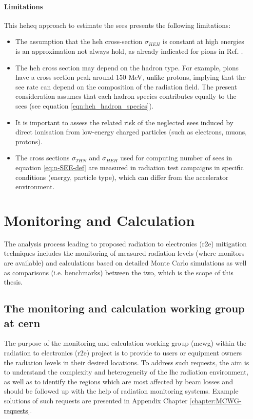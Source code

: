 \documentclass[encoding=utf8,british]{tumphthesis}
\begin{document}
\subsubsection{Limitations}

This \acrshort{heheq} approach to estimate the \acrshort{see}s presents the following limitations:
\begin{itemize}
    \item The assumption that the \acrshort{heh} cross-section $\sigma_{HEH}$ is constant at high energies is an approximation not always hold, as already indicated for pions in Ref. \cite{Coronetti:2725324}. 
    \item The \acrshort{heh} cross section may depend on the hadron type. For example, pions have a cross section peak around 150 MeV, unlike protons, implying that the \acrshort{see} rate can depend on the composition of the radiation field. The present consideration assumes that each hadron species contributes equally to the \acrshort{see}s (see equation \ref{eqn:heh_hadron_species}).
    \item It is important to assess the related risk of the neglected \acrshort{see}s induced by direct ionisation from low-energy charged particles (such as electrons, muons, protons).
    \item The cross sections $\sigma_{THN}$ and $\sigma_{HEH}$ used for computing number of \acrshort{see}s in equation \ref{eq:n-SEE-def} are measured in radiation test campaigns in specific conditions (energy, particle type), which can differ from the accelerator environment.
\end{itemize}




\chapter{Monitoring and Calculation}
\label{chapter:MCWG}
The analysis process leading to proposed radiation to electronics (\acrshort{r2e}) mitigation techniques includes the monitoring of measured radiation levels (where monitors are available) and calculations based on detailed Monte Carlo simulations as well as comparisons (i.e. benchmarks) between the two, which is the scope of this thesis.

\section{The monitoring and calculation working group at \acrshort{cern}}
The purpose of the monitoring and calculation working group (\acrshort{mcwg}) within the radiation to electronics (\acrshort{r2e}) project is to provide to users or equipment owners the radiation levels in their desired locations. To address such requests, the aim is to understand the complexity and heterogeneity of the \acrshort{lhc} radiation environment, as well as to identify the regions which are most affected by beam losses and should be followed up with the help of radiation monitoring systems. Example solutions of such requests are presented in Appendix Chapter \ref{chapter:MCWG-requests}.
\end{document}
